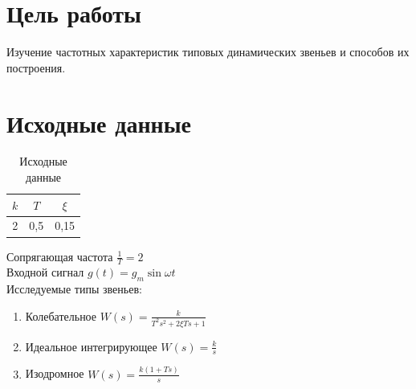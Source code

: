 \documentclass[a4paper, 11pt, russian]{article}
\begin{document}
    
    \section*{Цель работы}
    Изучение частотных характеристик типовых динамических звеньев и способов их построения.
    \section*{Исходные данные}
    \begin{table}[h!]
        \flushleft
        \caption{Исходные данные}
        \begin{tabular}{|c|c|c|}
        	\hline
            $k$ & $T$ & $\xi$ \\
            \hline
            2 & 0,5 & 0,15 \\
            \hline
        \end{tabular}
    \end{table}
    \flushleft 
    Сопрягающая частота $\displaystyle{\frac{1}{T}} = 2$\\
    Входной сигнал $g(t) = g_m\sin{\omega t}$\\
    Исследуемые типы звеньев:
    \begin{enumerate}
        \item Колебательное $W(s) = \displaystyle{\frac{k}{T^2s^2 + 2\xi Ts + 1}}$
        \item Идеальное интегрирующее $W(s) = \displaystyle{\frac{k}{s}}$
        \item Изодромное $W(s) = \displaystyle{\frac{k(1 + Ts)}{s}}$
    \end{enumerate}
    \clearpage
\end{document}

